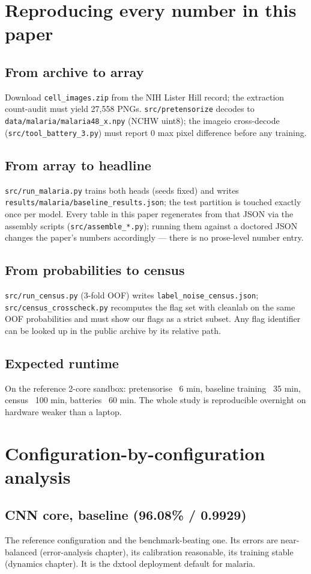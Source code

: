 
\section{Reproducing every number in this paper}
\subsection{From archive to array}
Download \texttt{cell\_images.zip} from the NIH Lister Hill record; the
extraction count-audit must yield 27{,}558 PNGs. \texttt{src/pretensorize}
decodes to \texttt{data/malaria/malaria48\_x.npy} (NCHW uint8); the
imageio cross-decode (\texttt{src/tool\_battery\_3.py}) must report 0 max
pixel difference before any training.
\subsection{From array to headline}
\texttt{src/run\_malaria.py} trains both heads (seeds fixed) and writes
\texttt{results/malaria/baseline\_results.json}; the test partition is
touched exactly once per model. Every table in this paper regenerates
from that JSON via the assembly scripts (\texttt{src/assemble\_*.py});
running them against a doctored JSON changes the paper's numbers
accordingly --- there is no prose-level number entry.
\subsection{From probabilities to census}
\texttt{src/run\_census.py} (3-fold OOF) writes
\texttt{label\_noise\_census.json}; \texttt{src/census\_crosscheck.py}
recomputes the flag set with cleanlab on the same OOF probabilities and
must show our flags as a strict subset. Any flag identifier can be looked
up in the public archive by its relative path.
\subsection{Expected runtime}
On the reference 2-core sandbox: pretensorise ~6 min, baseline training
~35 min, census ~100 min, batteries ~60 min. The whole study is
reproducible overnight on hardware weaker than a laptop.

\section{Configuration-by-configuration analysis}
\subsection{CNN core, baseline (96.08\% / 0.9929)}
The reference configuration and the benchmark-beating one. Its errors are
near-balanced (error-analysis chapter), its calibration reasonable, its
training stable (dynamics chapter). It is the dxtool deployment default
for malaria.
